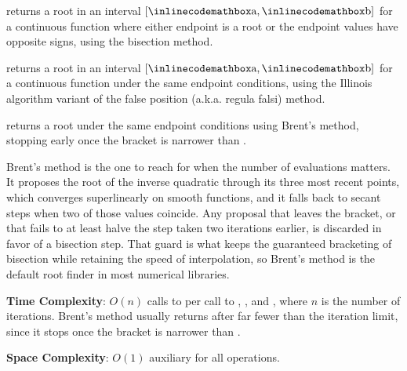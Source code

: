 \begin{compactitem}
  \item {} returns a root in an interval $[{\inlinecodemath{a}}, {\inlinecodemath{b}}]$ for a continuous function  where either endpoint is a root or the endpoint values have opposite signs, using the bisection method.
  \item {} returns a root in an interval $[{\inlinecodemath{a}}, {\inlinecodemath{b}}]$ for a continuous function  under the same endpoint conditions, using the Illinois algorithm variant of the false position (a.k.a. regula falsi) method.
  \item {} returns a root under the same endpoint conditions using Brent's method, stopping early once the bracket is narrower than .
\end{compactitem}

Brent's method is the one to reach for when the number of evaluations matters. It proposes the root of the inverse quadratic through its three most recent points, which converges superlinearly on smooth functions, and it falls back to secant steps when two of those values coincide. Any proposal that leaves the bracket, or that fails to at least halve the step taken two iterations earlier, is discarded in favor of a bisection step. That guard is what keeps the guaranteed bracketing of bisection while retaining the speed of interpolation, so Brent's method is the default root finder in most numerical libraries.

\textbf{Time Complexity}: $O(n)$ calls to  per call to , , and , where $n$ is the number of iterations. Brent's method usually returns after far fewer than the iteration limit, since it stops once the bracket is narrower than .

\textbf{Space Complexity}: $O(1)$ auxiliary for all operations.

